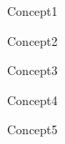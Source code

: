 \begin{concept}{Concept1}
  \lipsum[1-2]
\end{concept}

\begin{concept}{Concept2}
  \lipsum[3]
\end{concept}

\begin{concept}{Concept3}
  \lipsum[4-5]
\end{concept}

\begin{concept}{Concept4}
  \lipsum[6-8]
\end{concept}

\begin{concept}{Concept5}
  \lipsum[9]
\end{concept}